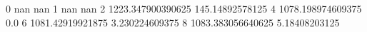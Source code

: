 0 nan nan
1 nan nan
2 1223.347900390625 145.14892578125
4 1078.198974609375 0.0
6 1081.42919921875 3.230224609375
8 1083.383056640625 5.18408203125
